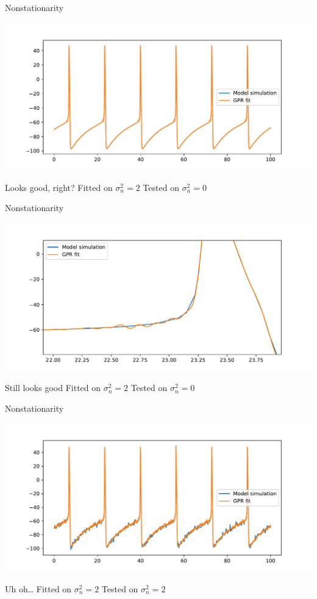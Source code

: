 \documentclass[presentation]{beamer}
\begin{document}
\begin{frame}[label={sec:org462fc9f}]{Nonstationarity}
\begin{center}
\includegraphics[width=.9\textwidth]{./HH_good.pdf}
\end{center}

Looks good, right? \hfill Fitted on \(\sigma_n^2=2\) \hfill Tested on \(\sigma_n^2 = 0\)
\end{frame}

\begin{frame}[label={sec:orgd52c057}]{Nonstationarity}
\begin{center}
\includegraphics[width=.9\textwidth]{./HH_good_2.pdf}
\end{center}

Still looks good \hfill Fitted on \(\sigma_n^2=2\) \hfill Tested on \(\sigma_n^2 = 0\)
\end{frame}

\begin{frame}[label={sec:org50016a8}]{Nonstationarity}
\begin{center}
\includegraphics[width=.9\textwidth]{./HH_bad.pdf}
\end{center}

Uh oh\ldots{} \hfill Fitted on \(\sigma_n^2=2\) \hfill Tested on \(\sigma_n^2 = 2\)
\end{frame}
\end{document}

